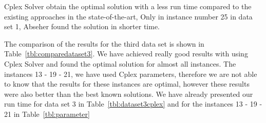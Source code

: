 Cplex Solver obtain the optimal solution with a less run time compared to the existing approaches in the state-of-the-art, Only in instance number 25 in data set 1, Abseher found the solution in shorter time.

The comparison of the results for the third data set is shown in Table~\ref{tbl:comparedataset3}. We have achieved really good results with using Cplex Solver and found the optimal solution for almost all instances. The instances 13 - 19 - 21, we have used Cplex parameters, therefore we are not able to know that the results for these instances are optimal, however these results were also better than the best known solutions. We have already presented our run time for data set 3 in Table~\ref{tbl:dataset3cplex} and for the instances 13 - 19 - 21 in Table~\ref{tbl:parameter}


